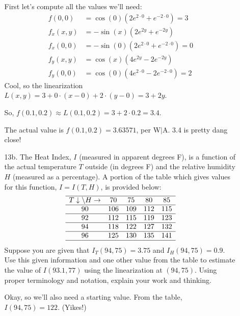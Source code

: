 \documentclass[10pt]{article}
\newenvironment{red}{\color{red}}{\ignorespacesafterend}
\begin{document}
\begin{enumerate}[leftmargin=0pt]
\begin{itemize}
        \begin{red}
        First let's compute all the values we'll need:
        \begin{align*}
            f(0, 0) &= \cos(0)(2e^{2\cdot 0}+e^{-2\cdot 0}) = 3 \\
            f_x(x,y) &= -\sin(x)(2e^{2y}+e^{-2y}) \\
            f_x(0,0) &= -\sin(0)(2e^{2\cdot 0}+e^{-2\cdot 0}) = 0 \\
            f_y(x, y) &= \cos(x)(4e^{2y}-2e^{-2y}) \\
            f_y(0, 0) &= \cos(0)(4e^{2\cdot 0}-2e^{-2\cdot 0}) = 2
        \end{align*}
        Cool, so the linearization $L(x, y) = 3 + 0\cdot(x-0) + 2\cdot(y-0) = 3 + 2y.$
        
        So, $f(0.1, 0.2) \approx L(0.1, 0.2) = 3 + 2\cdot 0.2 = 3.4$. 
        
        The actual value is $f(0.1, 0.2) = 3.63571$, per W$|$A. 3.4 is pretty dang close!
        \end{red}
        
        \item[13b.] The Heat Index, $I$ (measured in apparent degrees F), is a function of the actual temperature $T$ outside (in degrees F) and the relative humidity $H$ (measured as a percentage). A portion of the table which gives values for this function, $I = I(T, H)$, is provided below:
        \[
        \begin{array}{ccccc}\hline T \downarrow \backslash H \rightarrow & {70} & {75} & {80} & {85} \\ \hline 90 & {106} & {109} & {112} & {115} \\ \hline 92 & {112} & {115} & {119} & {123} \\ \hline 94 & {118} & {122} & {127} & {132} \\ \hline 96 & {125} & {130} & {135} & {141} \\ \hline\end{array}
        \]
        Suppose you are given that $I_T(94,75) = 3.75$ and $I_H(94, 75) = 0.9$. Use this given information and one other value from the table to estimate the value of $I(93.1, 77)$ using the linearization at $(94, 75)$. Using proper terminology and notation, explain your work and thinking.
        
        \begin{red}
        Okay, so we'll also need a starting value. From the table, $I(94,75) = 122$. (Yikes!)
        

\end{red}
\end{itemize}
\end{enumerate}
\end{document}
